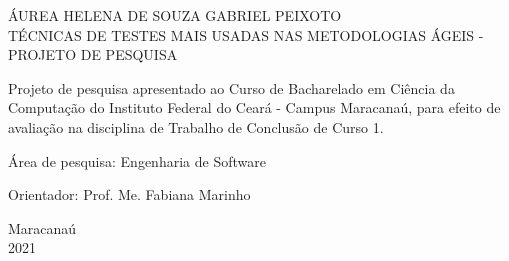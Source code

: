 \begin{titlepage}
\vfill
\begin{center}

    {\large ÁUREA HELENA DE SOUZA GABRIEL PEIXOTO\\}
    \vspace{2cm}
    {\Large \textsc{T{\'E}CNICAS DE TESTES MAIS USADAS NAS METODOLOGIAS {\'A}GEIS - PROJETO DE PESQUISA}\\}
    \vspace{1cm}
    \hspace{.45\linewidth}
    \begin{minipage}{.50\linewidth}

            Projeto de pesquisa apresentado ao Curso de Bacharelado em Ciência da Computação do Instituto Federal do Ceará - Campus Maracanaú, para efeito de avaliação na disciplina de Trabalho de Conclusão de Curso 1.

            \vspace{0.5 cm}

            Área de pesquisa: Engenharia de Software

            \vspace{0.5 cm}

            Orientador: Prof. Me. Fabiana Marinho
    
    \end{minipage}

    \vspace{2cm}
    \vfill
    {\large Maracanaú\\ 2021}
\end{center}

\end{titlepage}
